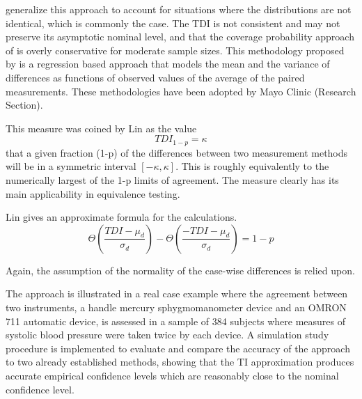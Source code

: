 \documentclass[12pt, a4paper]{report}
\theoremstyle{plain}
\theoremstyle{definition}
\theoremstyle{remark}
\begin{document}
	\citet{pkcng} generalize this approach to account for situations where the distributions are not identical, which is commonly the case.
	The TDI is not consistent and may not preserve its asymptotic nominal level, and that the coverage probability approach of \citet{lin2002} is overly conservative for moderate sample sizes.
	This methodology proposed by \citet{pkcng} is a regression based approach that models the mean and the variance of differences as functions of observed values of the average of the paired measurements.
	These methodologies have been adopted by Mayo Clinic (Research Section).
	
	
	This measure was coined by Lin as the value \[TDI_{1-p} = \kappa\] that a given fraction (1-p) of the differences between two measurement methods will be in a symmetric interval $[-\kappa,\kappa]$.
	This is roughly equivalently to the numerically largest of the 1-p limits of agreement.
	The measure clearly has its main applicability in equivalence testing. 
	
	Lin gives an approximate formula for the calculations.
	\[\Theta \left( \frac{ TDI - \mu_d}{\sigma_d} \right) - \Theta \left(  \frac{ -TDI - \mu_d}{\sigma_d} \right) = 1-p\]
	
	Again, the assumption of the normality of the case-wise differences is relied upon.
	
	The approach is illustrated in a real case example where the agreement between two instruments, a handle mercury sphygmomanometer device and an OMRON 711 automatic device, is assessed in a sample of 384 subjects where measures of systolic blood pressure were taken twice by each device. A simulation study procedure is implemented to evaluate and compare the accuracy of the approach to two already established methods, showing that the TI approximation produces accurate empirical confidence levels which are reasonably close to the nominal confidence level.
	
	
\end{document}
